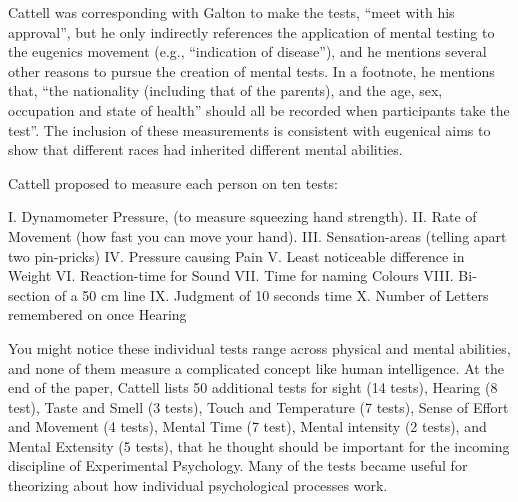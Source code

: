 \documentclass[
  oneside,
  12pt]{crumpbook}
\begin{document}
Cattell was corresponding with Galton to make the tests, ``meet with his approval'', but he only indirectly references the application of mental testing to the eugenics movement (e.g., ``indication of disease''), and he mentions several other reasons to pursue the creation of mental tests. In a footnote, he mentions that, ``the nationality (including that of the parents), and the age, sex, occupation and state of health'' should all be recorded when participants take the test''. The inclusion of these measurements is consistent with eugenical aims to show that different races had inherited different mental abilities.

Cattell proposed to measure each person on ten tests:

I. Dynamometer Pressure, (to measure squeezing hand strength).
II. Rate of Movement (how fast you can move your hand).
III. Sensation-areas (telling apart two pin-pricks)
IV. Pressure causing Pain
V. Least noticeable difference in Weight
VI. Reaction-time for Sound
VII. Time for naming Colours
VIII. Bi-section of a 50 cm line
IX. Judgment of 10 seconds time
X. Number of Letters remembered on once Hearing

You might notice these individual tests range across physical and mental abilities, and none of them measure a complicated concept like human intelligence. At the end of the paper, Cattell lists 50 additional tests for sight (14 tests), Hearing (8 test), Taste and Smell (3 tests), Touch and Temperature (7 tests), Sense of Effort and Movement (4 tests), Mental Time (7 test), Mental intensity (2 tests), and Mental Extensity (5 tests), that he thought should be important for the incoming discipline of Experimental Psychology. Many of the tests became useful for theorizing about how individual psychological processes work.
\end{document}
